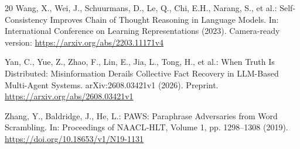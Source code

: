 \documentclass{svproc}
\begin{document}
\begin{thebibliography}{20}
Wang, X., Wei, J., Schuurmans, D., Le, Q., Chi, E.H., Narang, S., et al.: Self-Consistency Improves Chain of Thought Reasoning in Language Models.
In: International Conference on Learning Representations (2023).
Camera-ready version: \url{https://arxiv.org/abs/2203.11171v4}

Yan, C., Yue, Z., Zhao, F., Lin, E., Jia, L., Tong, H., et al.:
When Truth Is Distributed: Misinformation Derails Collective Fact Recovery in
LLM-Based Multi-Agent Systems. arXiv:2608.03421v1 (2026). Preprint.
\url{https://arxiv.org/abs/2608.03421v1}

Zhang, Y., Baldridge, J., He, L.: PAWS: Paraphrase Adversaries from Word Scrambling.
In: Proceedings of NAACL-HLT, Volume 1, pp. 1298--1308 (2019).
\url{https://doi.org/10.18653/v1/N19-1131}
\end{thebibliography}
\end{document}
